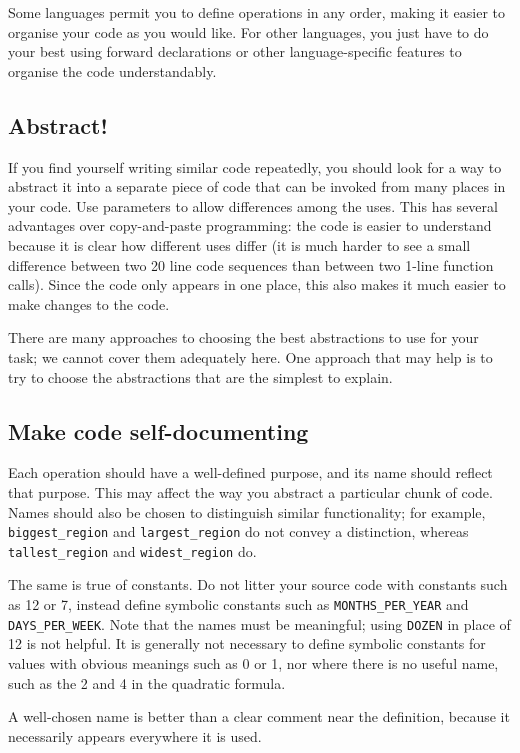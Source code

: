 \documentclass[a4paper]{article}
\begin{document}
Some languages permit you to define operations in any order, making it easier
to organise your code as you would like.  For other languages, you just have to
do your best using forward declarations or other language-specific features
to organise the code understandably.


\subsection{Abstract!}
If you find yourself writing similar code repeatedly, you should look for a
way to abstract it into a separate piece of code that can be invoked from
many places in your code.  Use parameters to allow differences among the
uses.  This has several advantages over copy-and-paste programming:  the code
is easier to understand because it is clear how different uses differ (it is
much harder to see a small difference between two 20 line code sequences than
between two 1-line function calls).  Since the code only appears in one
place, this also makes it much easier to make changes to the code.

There are many approaches to choosing the best abstractions to use for your
task; we cannot cover them adequately here.  One approach that may help is to
try to choose the abstractions that are the simplest to explain.

\subsection{Make code self-documenting}
Each operation should have a well-defined purpose, and
its name should reflect that purpose.  This may affect the way you abstract a
particular chunk of code.  Names should also be chosen to distinguish similar
functionality; for example, \texttt{biggest\_region} and
\texttt{largest\_region} do not convey a distinction, whereas
\texttt{tallest\_region} and \texttt{widest\_region} do.

The same is true of constants.  Do not litter your source code with constants
such as 12 or 7, instead define symbolic constants such as
\texttt{MONTHS\_PER\_YEAR} and \texttt{DAYS\_PER\_WEEK}.  Note that the names
must be meaningful; using \texttt{DOZEN} in place of 12 is not helpful.  It
is generally not necessary to define symbolic constants for values with
obvious meanings such as 0 or 1, nor where there is no useful name, such as
the 2 and 4 in the quadratic formula.

A well-chosen name is better than a clear comment near the definition, because
it necessarily appears everywhere it is used.
\end{document}
